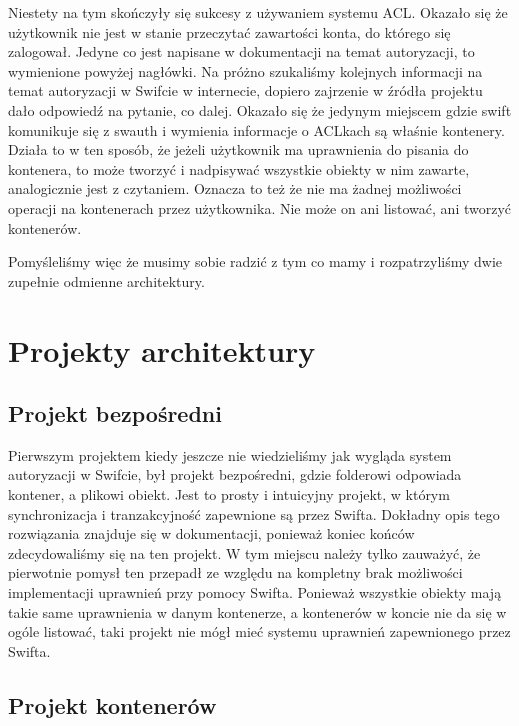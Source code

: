 	Niestety na tym skończyły się sukcesy z używaniem systemu ACL. Okazało się że użytkownik nie jest w stanie przeczytać zawartości konta, do którego się zalogował. Jedyne co jest napisane w dokumentacji na temat autoryzacji, to wymienione powyżej nagłówki. Na próżno szukaliśmy kolejnych informacji na temat autoryzacji w Swifcie w internecie, dopiero zajrzenie w źródła projektu dało odpowiedź na pytanie, co dalej. Okazało się że jedynym miejscem gdzie swift komunikuje się z swauth i wymienia informacje o ACLkach są właśnie kontenery. Działa to w ten sposób, że jeżeli użytkownik ma uprawnienia do pisania do kontenera, to może tworzyć i nadpisywać wszystkie obiekty w nim zawarte, analogicznie jest z czytaniem. Oznacza to też że nie ma żadnej możliwości operacji na kontenerach przez użytkownika. Nie może on ani listować, ani tworzyć kontenerów.

	Pomyśleliśmy więc że musimy sobie radzić z tym co mamy i rozpatrzyliśmy dwie zupełnie odmienne architektury.
	
	\section{Projekty architektury}\label{sec:projekty architektury}

	\subsection{Projekt bezpośredni}\label{sub:projekt bezposredni}

	Pierwszym projektem kiedy jeszcze nie wiedzieliśmy jak wygląda system autoryzacji w Swifcie, był projekt bezpośredni, gdzie folderowi odpowiada kontener, a plikowi obiekt. Jest to prosty i intuicyjny projekt, w którym synchronizacja i tranzakcyjność zapewnione są przez Swifta. Dokładny opis tego rozwiązania znajduje się w dokumentacji, ponieważ koniec końców zdecydowaliśmy się na ten projekt. W tym miejscu należy tylko zauważyć, że pierwotnie pomysł ten przepadł ze względu na kompletny brak możliwości implementacji uprawnień przy pomocy Swifta. Ponieważ wszystkie obiekty mają takie same uprawnienia w danym kontenerze, a kontenerów w koncie nie da się w ogóle listować, taki projekt nie mógł mieć systemu uprawnień zapewnionego przez Swifta.
	
	\subsection{Projekt kontenerów}\label{sub:projekt kontenerow}

